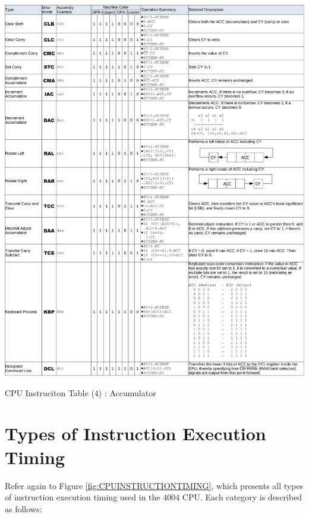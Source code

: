 \begin{table}[htbp]
    \includegraphics[width=1.00\columnwidth]{./Table/ISA(4)Accumulator.pdf}
    \caption{CPU Instruciton Table (4) : Accumulator}
    \label{tb:ISA4ACCUMULATOR}
\end{table}
\section{Types of Instruction Execution Timing}

Refer again to Figure \ref{fig:CPUINSTRUCTIONTIMING}, which presents all types of instruction execution timing used in the 4004 CPU. Each category is described as follows:

